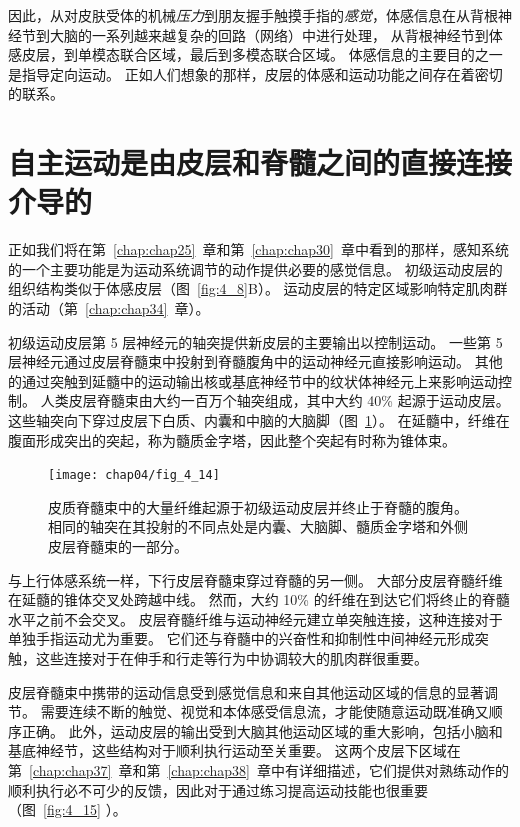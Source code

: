 因此，从对皮肤受体的机械\textit{压力}到朋友握手触摸手指的\textit{感觉}，体感信息在从背根神经节到大脑的一系列越来越复杂的回路（网络）中进行处理，
从背根神经节到体感皮层，到单模态联合区域，最后到多模态联合区域。
体感信息的主要目的之一是指导定向运动。
正如人们想象的那样，皮层的体感和运动功能之间存在着密切的联系。



\section{自主运动是由皮层和脊髓之间的直接连接介导的}

正如我们将在第~\ref{chap:chap25}~章和第~\ref{chap:chap30}~章中看到的那样，感知系统的一个主要功能是为运动系统调节的动作提供必要的感觉信息。 
初级运动皮层的组织结构类似于体感皮层（图~\ref{fig:4_8}B）。 
运动皮层的特定区域影响特定肌肉群的活动（第~\ref{chap:chap34}~章）。


初级运动皮层第 5 层神经元的轴突提供新皮层的主要输出以控制运动。
一些第 5 层神经元通过皮层脊髓束中投射到脊髓腹角中的运动神经元直接影响运动。
其他的通过突触到延髓中的运动输出核或基底神经节中的纹状体神经元上来影响运动控制。
人类皮层脊髓束由大约一百万个轴突组成，其中大约 40\% 起源于运动皮层。
这些轴突向下穿过皮层下白质、内囊和中脑的大脑脚（图~\ref{fig:4_14}）。
在延髓中，纤维在腹面形成突出的突起，称为髓质金字塔，因此整个突起有时称为锥体束。


\begin{figure}[htbp]
	\centering
	\texttt{[image: chap04/fig\_4\_14]}
	\caption{皮质脊髓束中的大量纤维起源于初级运动皮层并终止于脊髓的腹角。
		相同的轴突在其投射的不同点处是内囊、大脑脚、髓质金字塔和外侧皮层脊髓束的一部分。}
	\label{fig:4_14}
\end{figure}


与上行体感系统一样，下行皮层脊髓束穿过脊髓的另一侧。 
大部分皮层脊髓纤维在延髓的锥体交叉处跨越中线。
然而，大约 10\% 的纤维在到达它们将终止的脊髓水平之前不会交叉。 
皮层脊髓纤维与运动神经元建立单突触连接，这种连接对于单独手指运动尤为重要。 
它们还与脊髓中的兴奋性和抑制性中间神经元形成突触，这些连接对于在伸手和行走等行为中协调较大的肌肉群很重要。


皮层脊髓束中携带的运动信息受到感觉信息和来自其他运动区域的信息的显著调节。 
需要连续不断的触觉、视觉和本体感受信息流，才能使随意运动既准确又顺序正确。 
此外，运动皮层的输出受到大脑其他运动区域的重大影响，包括小脑和基底神经节，这些结构对于顺利执行运动至关重要。 
这两个皮层下区域在第~\ref{chap:chap37}~章和第~\ref{chap:chap38}~章中有详细描述，它们提供对熟练动作的顺利执行必不可少的反馈，因此对于通过练习提高运动技能也很重要（图~\ref{fig:4_15} ）。

